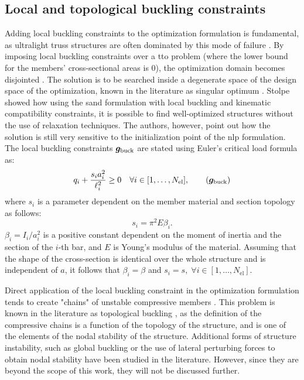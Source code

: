 \subsection{Local and topological buckling constraints}
Adding local buckling constraints to the optimization formulation is fundamental, as ultralight truss structures are often dominated by this mode of failure . By imposing local buckling constraints over a \gls{tto} problem (where the lower bound for the members' cross-sectional areas is 0), the optimization domain becomes disjointed . The solution is to be searched inside a degenerate space of the design space of the optimization, known in the literature as singular optimum . Stolpe  showed how using the \gls{sand} formulation with local buckling and kinematic compatibility constraints, it is possible to find well-optimized structures without the use of relaxation techniques. The authors, however, point out how the solution is still very sensitive to the initialization point of the \gls{nlp} formulation. The local buckling constraints $\bm{g}_{\text{buck}}$ are stated using Euler's critical load formula as:
\begin{equation}
    q_i  + \frac{s_i a_i^2}{\ell_i^2} \geq 0 \quad \forall i \in [1,\ldots, N_{\text{el}}],
    \tag{$\vect{g}_{\text{buck}}$}
    \label{eq:04_buck}
\end{equation}
where $s_i$ is a parameter dependent on the member material and section topology as follows:
\begin{equation}
    s_i=\pi^2 E \beta_i.
    \label{eq:04_s}
\end{equation}
$\beta_i=I_i/a^2_i$ is a positive constant dependent on the moment of inertia and the section of the $i$-th bar, and $E$ is Young's modulus of the material. Assuming that the shape of the cross-section is identical over the whole structure and is independent of $a$, it follows that  $\beta_i = \beta$ and $s_i = s, \; \forall i \in [1,\ldots, N_{\text{el}}]$.

Direct application of the local buckling constraint  in the optimization formulation tends to create "chains" of unstable compressive members . This problem is known in the literature as topological buckling , as the definition of the compressive chains is a function of the topology of the structure, and is one of the elements of the nodal stability of the structure. Additional forms of structure instability, such as global buckling  or the use of lateral perturbing forces to obtain nodal stability  have been studied in the literature. However, since they are beyond the scope of this work, they will not be discussed further.

